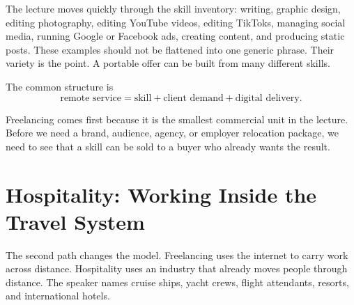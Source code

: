 The lecture moves quickly through the skill inventory: writing, graphic design, editing photography, editing YouTube videos, editing TikToks, managing social media, running Google or Facebook ads, creating content, and producing static posts. These examples should not be flattened into one generic phrase. Their variety is the point. A portable offer can be built from many different skills.

The common structure is
\begin{equation}
\text{remote service}
=
\text{skill}
+
\text{client demand}
+
\text{digital delivery}.
\end{equation}

Freelancing comes first because it is the smallest commercial unit in the lecture. Before we need a brand, audience, agency, or employer relocation package, we need to see that a skill can be sold to a buyer who already wants the result.

\begin{figure}
\centering
{}
\end{figure}

\section{Hospitality: Working Inside the Travel System}

The second path changes the model. Freelancing uses the internet to carry work across distance. Hospitality uses an industry that already moves people through distance. The speaker names cruise ships, yacht crews, flight attendants, resorts, and international hotels.

